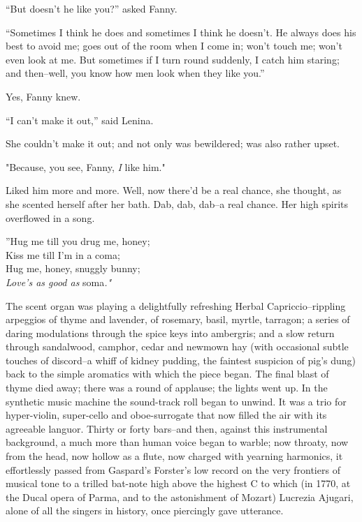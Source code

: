 \documentclass[12pt]{report}
\begin{document}
``But doesn't he like you?'' asked Fanny.

``Sometimes I think he does and sometimes I think he doesn't. He always
does his best to avoid me; goes out of the room when I come in; won't
touch me; won't even look at me. But sometimes if I turn round suddenly,
I catch him staring; and then--well, you know how men look when they
like you.''

Yes, Fanny knew.

``I can't make it out,'' said Lenina.

She couldn't make it out; and not only was bewildered; was also rather
upset.

"Because, you see, Fanny, \emph{I} like him."

Liked him more and more. Well, now there'd be a real chance, she
thought, as she scented herself after her bath. Dab, dab, dab--a real
chance. Her high spirits overflowed in a song.

\emph{}

''Hug me till you drug me, honey;\\

Kiss me till I'm in a coma;\\

Hug me, honey, snuggly bunny;\\

\emph{Love's as good as} soma\emph{."\\
}

The scent organ was playing a delightfully refreshing Herbal
Capriccio--rippling arpeggios of thyme and lavender, of rosemary, basil,
myrtle, tarragon; a series of daring modulations through the spice keys
into ambergris; and a slow return through sandalwood, camphor, cedar and
newmown hay (with occasional subtle touches of discord--a whiff of
kidney pudding, the faintest suspicion of pig's dung) back to the simple
aromatics with which the piece began. The final blast of thyme died
away; there was a round of applause; the lights went up. In the
synthetic music machine the sound-track roll began to unwind. It was a
trio for hyper-violin, super-cello and oboe-surrogate that now filled
the air with its agreeable languor. Thirty or forty bars--and then,
against this instrumental background, a much more than human voice began
to warble; now throaty, now from the head, now hollow as a flute, now
charged with yearning harmonics, it effortlessly passed from Gaspard's
Forster's low record on the very frontiers of musical tone to a trilled
bat-note high above the highest C to which (in 1770, at the Ducal opera
of Parma, and to the astonishment of Mozart) Lucrezia Ajugari, alone of
all the singers in history, once piercingly gave utterance.
\end{document}
